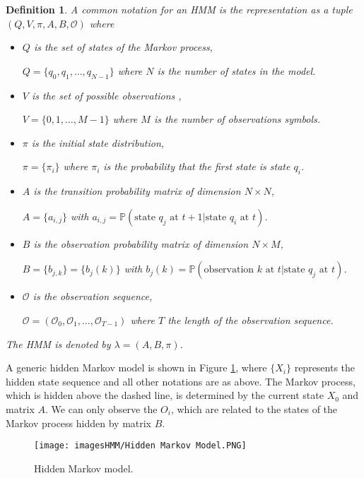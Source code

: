 \documentclass[12pt]{article}
\newtheorem{definition}{Definition}[section]
\def\OO{\mathcal{O}}
\def\PP{\mathbb{P}}
\numberwithin{equation}{section}
\begin{document}
\begin{definition}
A common notation for an HMM is the representation as a tuple $(Q, V, \pi, A, B, \OO)$ where
\begin{itemize}
\item $Q$ is the set of states of the Markov process,

$Q = \{ q_{0}, q_{1}, \dots, q_{N-1} \}$ where $N$ is the number of states in the model.

\item $V$ is the set of possible observations ,

$V = \{ 0, 1, \dots, M-1 \}$ where $M$ is the number of observations symbols.

\item $\pi$ is the initial state distribution,

$\pi = \{ \pi_{i} \}$ where $\pi_{i}$ is the probability that the first state is state $q_{i}$.

\item $A$ is the transition probability matrix of dimension $N \times N$,

$A = \{ a_{i,j} \}$ with $a_{i,j} = \PP(\text{state  } q_{j} \text{ at } t+1 | \text{state } q_{i} \text{ at } t)$.

\item $B$ is the observation probability matrix of dimension $N \times M$,

$B = \{ b_{j,k} \} =  \{ b_{j}(k) \}$ with $b_{j}(k) = \PP(\text{observation  } k \text{ at } t | \text{state } q_{j} \text{ at } t)$.

\item $\OO$ is the observation sequence,

$\OO = ( \OO_{0}, \OO_{1}, \dots, \OO_{T-1} )$ where $T$ the length of the observation sequence.
\end{itemize}

The HMM is denoted by $\lambda = (A,B,\pi)$.
\end{definition}

A generic hidden Markov model is shown in Figure \ref{figure:HMM}, where $\{X_{i}\}$ represents the hidden state sequence and all other notations are as above. The Markov process, which is hidden above the dashed line, is determined by the current state $X_{0}$ and matrix $A$. We can only observe the $O_{i}$, which are related to the states of the Markov process hidden by matrix $B$.
\begin{figure}[H]
\centering
\texttt{[image: imagesHMM/Hidden Markov Model.PNG]}
\caption{Hidden Markov model.\label{figure:HMM}}
\end{figure}
\end{document}
